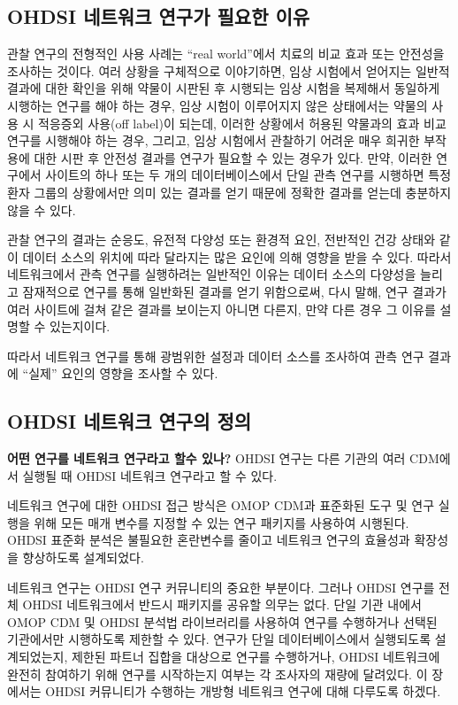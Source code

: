\documentclass[11pt]{book}
\theoremstyle{definition}
\theoremstyle{definition}
\theoremstyle{definition}
\theoremstyle{remark}
\let\BeginKnitrBlock\begin \let\EndKnitrBlock\end
\begin{document}
\subsection{OHDSI 네트워크 연구가 필요한 이유}\label{ohdsi----}

관찰 연구의 전형적인 사용 사례는 ``real world''에서 치료의 비교 효과
또는 안전성을 조사하는 것이다. 여러 상황을 구체적으로 이야기하면, 임상
시험에서 얻어지는 일반적 결과에 대한 확인을 위해 약물이 시판된 후
시행되는 임상 시험을 복제해서 동일하게 시행하는 연구를 해야 하는 경우,
임상 시험이 이루어지지 않은 상태에서는 약물의 사용 시 적응증외 사용(off
label)이 되는데, 이러한 상황에서 허용된 약물과의 효과 비교연구를
시행해야 하는 경우, 그리고, 임상 시험에서 관찰하기 어려운 매우 희귀한
부작용에 대한 시판 후 안전성 결과를 연구가 필요할 수 있는 경우가 있다.
만약, 이러한 연구에서 사이트의 하나 또는 두 개의 데이터베이스에서 단일
관측 연구를 시행하면 특정 환자 그룹의 상황에서만 의미 있는 결과를 얻기
때문에 정확한 결과를 얻는데 충분하지 않을 수 있다.

관찰 연구의 결과는 순응도, 유전적 다양성 또는 환경적 요인, 전반적인 건강
상태와 같이 데이터 소스의 위치에 따라 달라지는 많은 요인에 의해 영향을
받을 수 있다. 따라서 네트워크에서 관측 연구를 실행하려는 일반적인 이유는
데이터 소스의 다양성을 늘리고 잠재적으로 연구를 통해 일반화된 결과를
얻기 위함으로써, 다시 말해, 연구 결과가 여러 사이트에 걸쳐 같은 결과를
보이는지 아니면 다른지, 만약 다른 경우 그 이유를 설명할 수 있는지이다.

따라서 네트워크 연구를 통해 광범위한 설정과 데이터 소스를 조사하여 관측
연구 결과에 ``실제'' 요인의 영향을 조사할 수 있다.

\subsection{OHDSI 네트워크 연구의 정의}\label{ohdsi---}

\BeginKnitrBlock{rmdimportant}
\textbf{어떤 연구를 네트워크 연구라고 할수 있나?} OHDSI 연구는 다른
기관의 여러 CDM에서 실행될 때 OHDSI 네트워크 연구라고 할 수 있다.
\EndKnitrBlock{rmdimportant}

네트워크 연구에 대한 OHDSI 접근 방식은 OMOP CDM과 표준화된 도구 및 연구
실행을 위해 모든 매개 변수를 지정할 수 있는 연구 패키지를 사용하여
시행된다. OHDSI 표준화 분석은 불필요한 혼란변수를 줄이고 네트워크 연구의
효율성과 확장성을 향상하도록 설계되었다.

네트워크 연구는 OHDSI 연구 커뮤니티의 중요한 부분이다. 그러나 OHDSI
연구를 전체 OHDSI 네트워크에서 반드시 패키지를 공유할 의무는 없다. 단일
기관 내에서 OMOP CDM 및 OHDSI 분석법 라이브러리를 사용하여 연구를
수행하거나 선택된 기관에서만 시행하도록 제한할 수 있다. 연구가 단일
데이터베이스에서 실행되도록 설계되었는지, 제한된 파트너 집합을 대상으로
연구를 수행하거나, OHDSI 네트워크에 완전히 참여하기 위해 연구를
시작하는지 여부는 각 조사자의 재량에 달려있다. 이 장에서는 OHDSI
커뮤니티가 수행하는 개방형 네트워크 연구에 대해 다루도록 하겠다.
\end{document}
